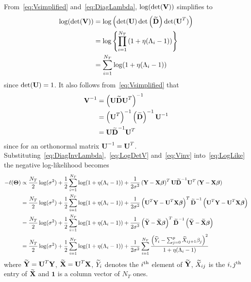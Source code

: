 From~\eqref{eq:Vsimplified} and~\eqref{eq:DiagLambda}, $\log(\det(\textbf{V}))$ simplifies to
\begin{align}
\log(\det(\textbf{V})) & =  \log  \left(  \det(\textbf{U}) \det\left(\widetilde{\textbf{D}}\right) \det(\textbf{U}^T)\right)   \nonumber \\
& =\log\left\lbrace \prod_{i=1}^{N_T}  \left( 1 + \eta (\Lambda_i-1) \right)  \right\rbrace \nonumber \\
& = \sum_{i=1}^{N_T} \log(1 + \eta (\Lambda_i-1)) \label{eq:LogDetV}
\end{align}
since $\det(\textbf{U}) = 1$. It also follows from~\eqref{eq:Vsimplified} that
\begin{align}
\textbf{V}^{-1} & = \left( \textbf{U} \widetilde{\textbf{D}} \textbf{U}^T \right)^{-1} \nonumber \\
& = \left( \textbf{U}^T \right)^{-1}  \left(\widetilde{\textbf{D}}\right)^{-1}    \textbf{U}^{-1} \nonumber \\
& = \textbf{U} \widetilde{\textbf{D}}^{-1} \textbf{U}^T \label{eq:Vinv}
\end{align}
since for an orthonormal matrix $\textbf{U}^{-1} = \textbf{U}^T$. Substituting~\eqref{eq:DiagInvLambda},~\eqref{eq:LogDetV} and~\eqref{eq:Vinv} into~\eqref{eq:LogLike} the negative log-likelihood becomes
\begin{align}
-\ell(\boldsymbol{\Theta}) & \propto \frac{N_T}{2}\log(\sigma^2) + \frac{1}{2} \sum_{i=1}^{N_T} \log(1 + \eta (\Lambda_i-1)) + \frac{1}{2\sigma^2} \left(\textbf{Y} - \textbf{X} \boldsymbol{\beta}\right)^T \textbf{U} \widetilde{\textbf{D}}^{-1} \textbf{U}^T \left(\textbf{Y} - \textbf{X} \boldsymbol{\beta}\right) \label{eq:Likelihood} \\
& = \frac{N_T}{2}\log(\sigma^2) + \frac{1}{2} \sum_{i=1}^{N_T} \log(1 + \eta (\Lambda_i-1)) + \frac{1}{2\sigma^2} \left(\textbf{U}^T\textbf{Y} - \textbf{U}^T\textbf{X} \boldsymbol{\beta}\right)^T \widetilde{\textbf{D}}^{-1} \left(\textbf{U}^T\textbf{Y} - \textbf{U}^T\textbf{X} \boldsymbol{\beta}\right)  \nonumber\\
& = \frac{N_T}{2}\log(\sigma^2) + \frac{1}{2} \sum_{i=1}^{N_T} \log(1 + \eta (\Lambda_i-1)) + \frac{1}{2\sigma^2} \left(\widetilde{\textbf{Y}} - \widetilde{\textbf{X}} \boldsymbol{\beta}\right)^T \widetilde{\textbf{D}}^{-1} \left(\widetilde{\textbf{Y}} - \widetilde{\textbf{X}} \boldsymbol{\beta}\right)  \nonumber\\
& = \frac{N_T}{2}\log(\sigma^2) + \frac{1}{2} \sum_{i=1}^{N_T} \log(1 + \eta (\Lambda_i-1)) + \frac{1}{2\sigma^2} \sum_{i=1}^{N_T}\frac{\left(  \widetilde{Y}_i - \sum_{j=0}^{p}\widetilde{X}_{ij+1}\beta_j \right) ^2}{1 + \eta (\Lambda_i-1)}  \label{eq:LikeFinal}
\end{align}
where $\widetilde{\textbf{Y}} = \textbf{U}^T \textbf{Y}$, $\widetilde{\textbf{X}} = \textbf{U}^T \textbf{X}$, $\widetilde{Y}_i$ denotes the $i^{\textrm{{th}}}$ element of $\widetilde{\textbf{Y}}$, $\widetilde{X}_{ij}$ is the $i,j^{\textrm{{th}}}$ entry of $\widetilde{\textbf{X}}$ and $\mathbf{1}$ is a column vector of $N_T$ ones.



